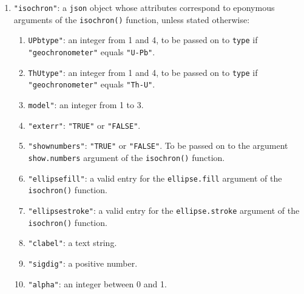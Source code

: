 \begin{refsection}
\begin{enumerate}[leftmargin=\parindent,align=left,
      labelwidth=\parindent,label*=2.\arabic*.]
\begin{enumerate}[leftmargin=\parindent,align=left,
      labelwidth=\parindent,label*=\arabic*.]
  \item{\tt "shownumbers"}: \texttt{"TRUE"} or \texttt{"FALSE"}. To be
    passed on to the argument \texttt{show.numbers} argument of the
    \texttt{evolution()} function.
  \item{\tt "sigdig"}: a positive number.
  \item{\tt "ellipsefill"}: a valid entry for the
    \texttt{ellipse.fill} argument of the \texttt{concordia()}
    function.
  \item{\tt "ellipsestroke"}: a valid entry for the
    \texttt{ellipse.stroke} argument of the \texttt{concordia()}
    function.
  \item{\tt "clabel"}: a text string.
  \item{\tt "model"}: an integer from 1 to 3.
  \end{enumerate}
\item{\tt "isochron"}: a \texttt{json} object whose attributes
  correspond to eponymous arguments of the \texttt{isochron()}
  function, unless stated otherwise:
  \begin{enumerate}[leftmargin=\parindent,align=left,
      labelwidth=\parindent,label*=\arabic*.]
      \item{\tt UPbtype"}: an integer from 1 and 4, to be passed on to
        \texttt{type} if \texttt{"geochronometer"} equals
        \texttt{"U-Pb"}.
      \item{\tt ThUtype"}: an integer from 1 and 4, to be passed on to
        \texttt{type} if \texttt{"geochronometer"} equals
        \texttt{"Th-U"}.
      \item{\tt model"}: an integer from 1 to 3.
      \item{\tt "exterr"}: \texttt{"TRUE"} or \texttt{"FALSE"}.
      \item{\tt "shownumbers"}: \texttt{"TRUE"} or \texttt{"FALSE"}. To be
        passed on to the argument \texttt{show.numbers} argument of the
        \texttt{isochron()} function.
      \item{\tt "ellipsefill"}: a valid entry for the
        \texttt{ellipse.fill} argument of the \texttt{isochron()}
        function.
      \item{\tt "ellipsestroke"}: a valid entry for the
        \texttt{ellipse.stroke} argument of the \texttt{isochron()}
        function.
      \item{\tt "clabel"}: a text string.
      \item{\tt "sigdig"}: a positive number.
      \item{\tt "alpha"}: an integer between 0 and 1.

\end{enumerate}
\end{enumerate}
\end{refsection}
